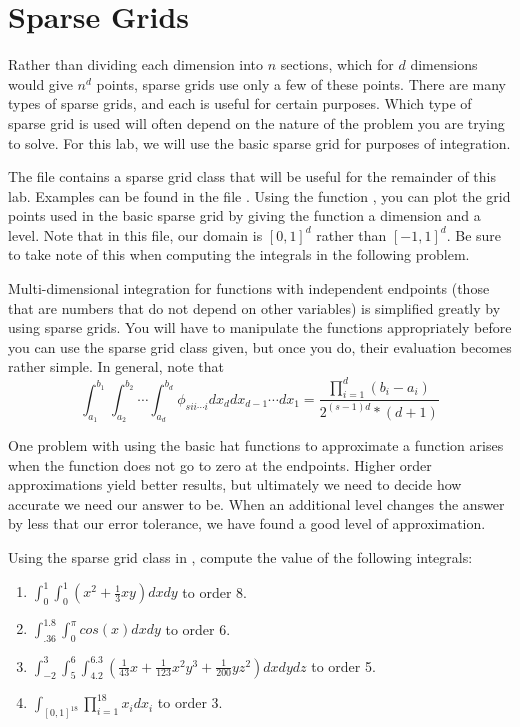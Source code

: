 \section*{Sparse Grids}
Rather than dividing each dimension into $n$ sections, which for $d$ dimensions would give $n^d$ points, sparse grids use only a few of these points.  There are many types of sparse grids, and each is useful for certain purposes.  Which type of sparse grid is used will often depend on the nature of the problem you are trying to solve.  For this lab, we will use the basic sparse grid for purposes of integration.

The file  contains a sparse grid class that will be useful for the remainder of this lab.  Examples can be found in the file .  Using the function , you can plot the grid points used in the basic sparse grid by giving the function  a dimension and a level.  Note that in this file, our domain is $[0,1]^d$ rather than $[-1,1]^d$.  Be sure to take note of this when computing the integrals in the following problem.  

Multi-dimensional integration for functions with independent endpoints (those that are numbers that do not depend on other variables) is simplified greatly by using sparse grids.  You will have to manipulate the functions appropriately before you can use the sparse grid class given, but once you do, their evaluation becomes rather simple.  In general, note that
\begin{equation*}
\int_{a_1}^{b_1} \int_{a_2}^{b_2} \cdots \int_{a_d}^{b_d} \phi_{sii\cdots i}dx_d dx_{d-1} \cdots dx_1= \frac{\prod_{i=1}^d (b_i-a_i)}{2^{(s-1)d}*(d+1)}
\end{equation*}

One problem with using the basic hat functions to approximate a function arises when the function does not go to zero at the endpoints.  Higher order approximations yield better results, but ultimately we need to decide how accurate we need our answer to be.  When an additional level changes the answer by less that our error tolerance, we have found a good level of approximation.

\begin{problem}
Using the sparse grid class in , compute the value of the following integrals:
\begin{enumerate}
\item $\int_{0}^1 \int_{0}^1 (x^2+\frac{1}{3}xy)dx dy$ to order 8.
\item $\int_{.36}^{1.8} \int_{0}^{\pi} cos(x) dx dy$ to order 6.
\item $\int_{-2}^3 \int_{5}^6 \int_{4.2}^{6.3} (\frac{1}{43}x+\frac{1}{123}x^2 y^3 + \frac{1}{200}yz^2)dx dy dz$ to order 5.
\item $\int_{[0,1]^{18}} \prod_{i=1}^{18} x_i dx_i$ to order 3.
\end{enumerate}
\end{problem}